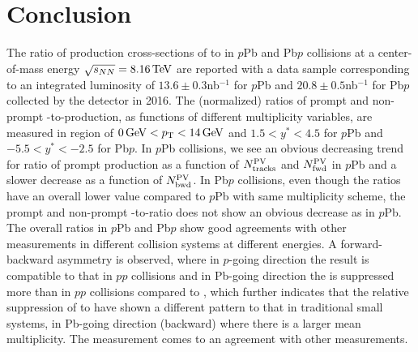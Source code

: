\section{Conclusion}
\label{conclusion}
The ratio of production cross-sections of \psitwos to \jpsi in $p$Pb and Pb$p$ collisions at a center-of-mass energy $\sqrt{s_{NN}}=8.16\text{\,Te\kern -0.1em V}$ are reported with a data sample corresponding to an integrated luminosity of $13.6\pm0.3$nb$^{-1}$ for $p$Pb and $20.8\pm0.5$nb$^{-1}$ for Pb$p$ collected by the \lhcb detector in 2016. The (normalized) ratios of prompt and non-prompt \psitwos-to-\jpsi production, as functions of different multiplicity variables, are measured in region of $0\text{\,Ge\kern -0.1em V}<p_{\mathrm{T}}<14\text{\,Ge\kern -0.1em V}$ and $1.5<y^*<4.5$ for $p$Pb and $-5.5<y^*<-2.5$ for Pb$p$.
 In $p$Pb collisions, we see an obvious decreasing trend for ratio of prompt production as a function of $N^{\rm PV}_{\rm tracks}$ and $N^{\rm PV}_{\rm fwd}$ in $p$Pb and a slower decrease as a function of $N^{\rm PV}_{\rm bwd}$. In Pb$p$ collisions, even though the ratios have an overall lower value compared to $p$Pb with same multiplicity scheme, the prompt and non-prompt \psitwos-to-\jpsi ratio does not show an obvious decrease as in $p$Pb. The overall ratios in $p$Pb and Pb$p$ show good agreements with other measurements in different collision systems at different energies. A forward-backward asymmetry is observed, where in $p$-going direction the result is compatible to that in $pp$ collisions and in Pb-going direction the \psitwos is suppressed more than in $pp$ collisions compared to \jpsi, which further indicates that the relative suppression of \psitwos to \jpsi have shown a different pattern to that in traditional small systems, in Pb-going direction (backward) where there is a larger mean multiplicity. The measurement comes to an agreement with other measurements.

